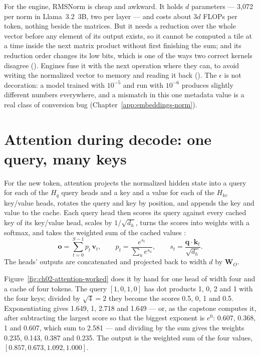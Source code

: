 For the engine, RMSNorm is cheap and awkward. It holds $d$ parameters --- 3,072
per norm in Llama~3.2~3B, two per layer --- and costs about $3d$ FLOPs per
token, nothing beside the matrices. But it needs a reduction over the whole
vector before any element of its output exists, so it cannot be computed a tile
at a time inside the next matrix product without first finishing the sum; and
its reduction order changes its low bits, which is one of the ways two correct
kernels disagree (). Engines fuse it with the next
operation where they can, to avoid writing the normalized vector to memory and
reading it back (). The $\epsilon$ is not decoration:
a model trained with $10^{-5}$ and run with $10^{-6}$ produces slightly
different numbers everywhere, and a mismatch in this one metadata value is a
real class of conversion bug (Chapter~\ref{app:embeddings-norm}).

\section{Attention during decode: one query, many keys}

For the new token, attention projects the normalized hidden state into a query
for each of the $H_q$ query heads and a key and a value for each of the
$H_{kv}$ key/value heads, rotates the query and key by position, and appends
the key and value to the cache. Each query head then scores its query against
every cached key of its key/value head, scales by $1/\sqrt{d_h}$, turns the
scores into weights with a softmax, and takes the weighted sum of the cached
values \cite{vaswani2017attention}:
\begin{equation}
\mathbf{o} = \sum_{t=0}^{S-1} p_t\,\mathbf{v}_t,
\qquad
p_t = \frac{e^{s_t}}{\sum_{u} e^{s_u}},
\qquad
s_t = \frac{\mathbf{q}\cdot\mathbf{k}_t}{\sqrt{d_h}} .
\label{eq:attention}
\end{equation}
The heads' outputs are concatenated and projected back to width $d$ by
$\mathbf{W}_O$.

Figure~\ref{fig:ch02-attention-worked} does it by hand for one head of width
four and a cache of four tokens. The query $[1, 0, 1, 0]$ has dot products 1,
0, 2 and 1 with the four keys; divided by $\sqrt{4} = 2$ they become the scores
0.5, 0, 1 and 0.5. Exponentiating gives 1.649, 1, 2.718 and 1.649 --- or, as
the capstone computes it, after subtracting the largest score so that the
biggest exponent is $e^0$: 0.607, 0.368, 1 and 0.607, which sum to 2.581 ---
and dividing by the sum gives the weights 0.235, 0.143, 0.387 and 0.235. The
output is the weighted sum of the four values, $[0.857, 0.673, 1.092, 1.000]$.

